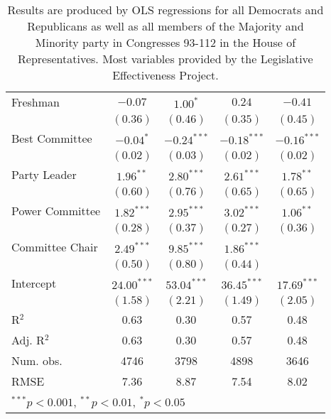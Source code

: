\documentclass[12pt]{article}
\newcommand\fnote[1]{\captionsetup{font=small}\caption*{#1}}
\begin{document}
\begin{table}[H]
\begin{center}
\begin{tabular}{l c c c c }
			Freshman               & $-0.07$       & $1.00^{*}$    & $0.24$        & $-0.41$       \\
			& $(0.36)$      & $(0.46)$      & $(0.35)$      & $(0.45)$      \\
			Best Committee          & $-0.04^{*}$   & $-0.24^{***}$ & $-0.18^{***}$ & $-0.16^{***}$ \\
			& $(0.02)$      & $(0.03)$      & $(0.02)$      & $(0.02)$      \\
			Party Leader                 & $1.96^{**}$   & $2.80^{***}$  & $2.61^{***}$  & $1.78^{**}$   \\
			& $(0.60)$      & $(0.76)$      & $(0.65)$      & $(0.65)$      \\
			Power Committee                  & $1.82^{***}$  & $2.95^{***}$  & $3.02^{***}$  & $1.06^{**}$   \\
			& $(0.28)$      & $(0.37)$      & $(0.27)$      & $(0.36)$      \\
			Committee Chair                  & $2.49^{***}$  & $9.85^{***}$  & $1.86^{***}$  &               \\
			& $(0.50)$      & $(0.80)$      & $(0.44)$      &               \\
			Intercept            & $24.00^{***}$ & $53.04^{***}$ & $36.45^{***}$ & $17.69^{***}$ \\
			& $(1.58)$      & $(2.21)$      & $(1.49)$      & $(2.05)$      \\
			\hline
			R$^2$                  & 0.63          & 0.30          & 0.57          & 0.48          \\
			Adj. R$^2$             & 0.63          & 0.30          & 0.57          & 0.48          \\
			Num. obs.              & 4746          & 3798          & 4898          & 3646          \\
			RMSE                   & 7.36          & 8.87          & 7.54          & 8.02          \\
			\hline
			\multicolumn{5}{l}{\scriptsize{$^{***}p<0.001$, $^{**}p<0.01$, $^*p<0.05$}}
		\end{tabular}
	\fnote{Results are produced by OLS regressions for all Democrats and Republicans as well as all members of the Majority and Minority party in Congresses 93-112 in the House of Representatives. Most variables provided by the Legislative Effectiveness Project.}
	\end{center}
\end{table}
\end{document}
